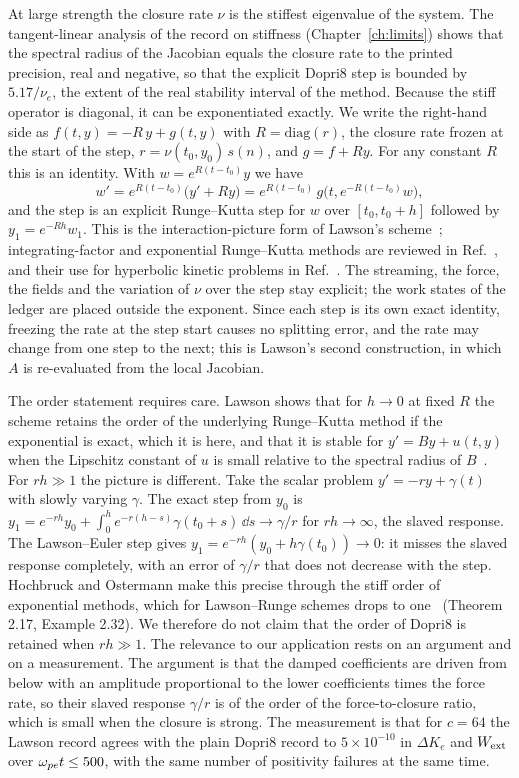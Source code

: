 At large strength the closure rate $\nu$ is the stiffest eigenvalue of the system. The tangent-linear analysis of the record on stiffness (Chapter~\ref{ch:limits}) shows that the spectral radius of the Jacobian equals the closure rate to the printed precision, real and negative, so that the explicit Dopri8 step is bounded by $5.17/\nu_e$, the extent of the real stability interval of the method. Because the stiff operator is diagonal, it can be exponentiated exactly. We write the right-hand side as $f(t,y)=-R\,y+g(t,y)$ with $R=\mathrm{diag}(r)$, the closure rate frozen at the start of the step, $r=\nu(t_0,y_0)\,s(n)$, and $g=f+Ry$. For any constant $R$ this is an identity. With $w=e^{R(t-t_0)}y$ we have
\begin{equation}
w'=e^{R(t-t_0)}\big(y'+Ry\big)=e^{R(t-t_0)}\,g\big(t,e^{-R(t-t_0)}w\big),
\label{eq:lawson}
\end{equation}
and the step is an explicit Runge--Kutta step for $w$ over $[t_0,t_0+h]$ followed by $y_1=e^{-Rh}w_1$. This is the interaction-picture form of Lawson's scheme~\cite{Lawson1967}; integrating-factor and exponential Runge--Kutta methods are reviewed in Ref.~\cite{Hochbruck2010}, and their use for hyperbolic kinetic problems in Ref.~\cite{Crouseilles2020}. The streaming, the force, the fields and the variation of $\nu$ over the step stay explicit; the work states of the ledger are placed outside the exponent. Since each step is its own exact identity, freezing the rate at the step start causes no splitting error, and the rate may change from one step to the next; this is Lawson's second construction, in which $A$ is re-evaluated from the local Jacobian.

The order statement requires care. Lawson shows that for $h\to0$ at fixed $R$ the scheme retains the order of the underlying Runge--Kutta method if the exponential is exact, which it is here, and that it is stable for $y'=By+u(t,y)$ when the Lipschitz constant of $u$ is small relative to the spectral radius of $B$~\cite{Lawson1967}. For $rh\gg1$ the picture is different. Take the scalar problem $y'=-ry+\gamma(t)$ with slowly varying $\gamma$. The exact step from $y_0$ is $y_1=e^{-rh}y_0+\int_0^he^{-r(h-s)}\gamma(t_0+s)\,\dd s\to\gamma/r$ for $rh\to\infty$, the slaved response. The Lawson--Euler step gives $y_1=e^{-rh}(y_0+h\gamma(t_0))\to0$: it misses the slaved response completely, with an error of $\gamma/r$ that does not decrease with the step. Hochbruck and Ostermann make this precise through the stiff order of exponential methods, which for Lawson--Runge schemes drops to one~\cite{Hochbruck2010} (Theorem 2.17, Example 2.32). We therefore do not claim that the order of Dopri8 is retained when $rh\gg1$. The relevance to our application rests on an argument and on a measurement. The argument is that the damped coefficients are driven from below with an amplitude proportional to the lower coefficients times the force rate, so their slaved response $\gamma/r$ is of the order of the force-to-closure ratio, which is small when the closure is strong. The measurement is that for $c=64$ the Lawson record agrees with the plain Dopri8 record to $5\times10^{-10}$ in $\Delta K_e$ and $W_{\rm ext}$ over $\omega_{pe} t\le500$, with the same number of positivity failures at the same time.

